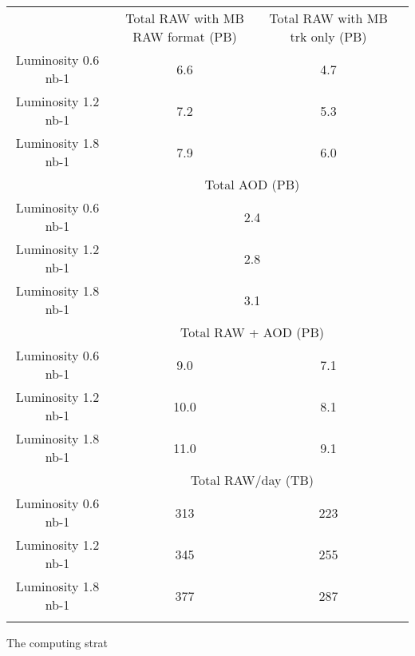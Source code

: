  
\begin{center}
\begin{tabular}{ |c|c|c|c|}


\hline
&  Total RAW with MB RAW format (PB) &  Total RAW with MB trk only (PB)\\
Luminosity 0.6 nb-1 & 6.6 & 4.7 \\
Luminosity 1.2 nb-1 & 7.2 & 5.3 \\ 
Luminosity 1.8 nb-1 & 7.9 & 6.0 \\                 
\hline
& \multicolumn{2}{c|}{Total AOD (PB)}\\
Luminosity 0.6 nb-1 & \multicolumn{2}{c|}{2.4} \\
Luminosity 1.2 nb-1 & \multicolumn{2}{c|}{2.8} \\ 
Luminosity 1.8 nb-1 & \multicolumn{2}{c|}{3.1} \\
\hline
&  \multicolumn{2}{c|}{Total RAW + AOD (PB)}\\
Luminosity 0.6 nb-1 & 9.0 & 7.1 \\
Luminosity 1.2 nb-1 & 10.0 & 8.1 \\ 
Luminosity 1.8 nb-1 & 11.0 & 9.1 \\   
\hline 
&  \multicolumn{2}{c|}{Total RAW/day (TB)}\\
Luminosity 0.6 nb-1 & 313 & 223 \\
Luminosity 1.2 nb-1 & 345 & 255 \\ 
Luminosity 1.8 nb-1 & 377 & 287 \\   
\hline 
\label{tab:datavolume}
\end{tabular}
\end{center}


The computing strat